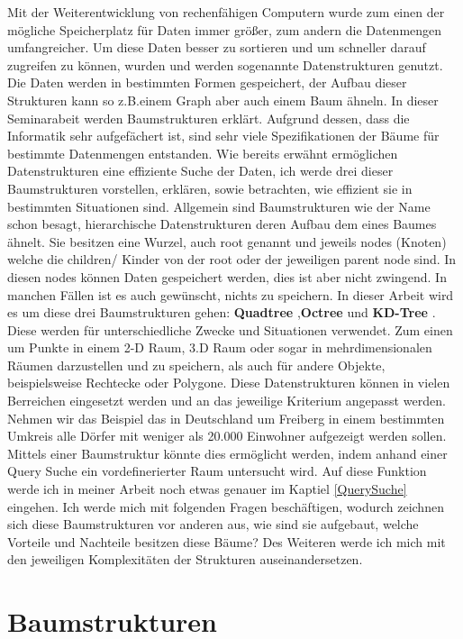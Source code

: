 \documentclass[11pt]{article}
\newcommand{\qt}{Quadtree }
\newcommand{\oc}{Octree }
\newcommand{\kd}{KD-Tree }
\newcommand{\fett}[1]{{\bf #1}}
\begin{document}
Mit der Weiterentwicklung von rechenfähigen Computern wurde zum einen der mögliche Speicherplatz für Daten immer größer, zum andern die Datenmengen umfangreicher. Um diese Daten besser zu sortieren und um schneller darauf zugreifen zu können, wurden und werden sogenannte Datenstrukturen genutzt. Die Daten werden in bestimmten Formen gespeichert, der Aufbau dieser Strukturen kann so z.B.einem Graph aber auch einem Baum ähneln. 
In dieser Seminarabeit werden Baumstrukturen erklärt. Aufgrund dessen, dass die Informatik sehr aufgefächert ist, sind sehr viele Spezifikationen der Bäume für bestimmte Datenmengen entstanden.  
Wie bereits erwähnt ermöglichen Datenstrukturen eine effiziente Suche der Daten, ich werde drei dieser Baumstrukturen vorstellen, erklären, sowie betrachten, wie effizient sie in bestimmten Situationen sind. 
\newline
Allgemein sind Baumstrukturen wie der Name schon besagt, hierarchische Datenstrukturen deren Aufbau dem eines Baumes ähnelt. Sie besitzen eine Wurzel, auch root genannt und jeweils nodes (Knoten) welche die children/ Kinder von der root oder der jeweiligen parent node sind.  In diesen nodes können Daten gespeichert werden, dies ist aber nicht zwingend. In manchen Fällen ist es auch gewünscht, nichts zu speichern.  
In dieser Arbeit wird es um diese drei Baumstrukturen gehen: \fett \qt ,\fett \oc und \fett \kd. Diese werden für unterschiedliche Zwecke und Situationen verwendet. Zum einen um Punkte in einem 2-D Raum, 3.D Raum oder sogar in mehrdimensionalen Räumen darzustellen und zu speichern, als auch für andere Objekte, beispielsweise Rechtecke oder Polygone.
Diese Datenstrukturen können in vielen Berreichen eingesetzt werden und an das jeweilige Kriterium angepasst werden. Nehmen wir das Beispiel das in Deutschland um Freiberg in einem bestimmten Umkreis alle Dörfer mit weniger als 20.000 Einwohner aufgezeigt werden sollen.\newline 
Mittels einer Baumstruktur könnte dies ermöglicht werden, indem anhand einer Query Suche ein vordefinerierter Raum untersucht wird. Auf diese Funktion werde ich in meiner Arbeit noch etwas genauer im Kaptiel \ref{QuerySuche} eingehen.\newline
Ich werde mich mit folgenden Fragen beschäftigen, wodurch zeichnen sich diese Baumstrukturen vor anderen aus, wie sind sie aufgebaut, welche Vorteile und Nachteile besitzen diese Bäume? 
Des Weiteren werde ich mich  mit den jeweiligen Komplexitäten der Strukturen auseinandersetzen.  

\pagebreak
\section{Baumstrukturen} \label{TreeStructures}
\end{document}
